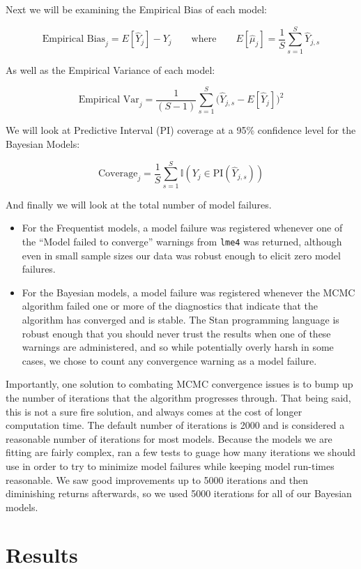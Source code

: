 \documentclass[12pt,twoside]{reedthesis}
\providecommand{\tightlist}{%
  \setlength{\itemsep}{0pt}\setlength{\parskip}{0pt}}
\begin{document}
Next we will be examining the Empirical Bias of each model:

\[
\text{Empirical Bias}_j = E[\hat{Y}_j] - Y_{j} \qquad \text{where} \qquad E[\hat{\mu}_j] = \frac{1}{S}\sum_{s = 1}^S\hat{Y}_{j, s}
\]

As well as the Empirical Variance of each model:

\[
\text{Empirical Var}_j  = \frac{1}{(S-1)}\sum_{s = 1}^S\Big(\hat{Y}_{j,s} - E[\hat{Y}_j]\Big)^2
\]

We will look at Predictive Interval (PI) coverage at a 95\% confidence level for the Bayesian Models:

\[
\text{Coverage}_j = \frac{1}{S}\sum_{s = 1}^S \mathbb{I}(Y_{j} \in \text{PI}(\hat{Y}_{j, s}))
\]

And finally we will look at the total number of model failures.
\begin{itemize}
\tightlist
\item
  For the Frequentist models, a model failure was registered whenever one of the ``Model failed to converge'' warnings from \texttt{lme4} was returned, although even in small sample sizes our data was robust enough to elicit zero model failures.
\item
  For the Bayesian models, a model failure was registered whenever the MCMC algorithm failed one or more of the diagnostics that indicate that the algorithm has converged and is stable. The Stan programming language is robust enough that you should never trust the results when one of these warnings are administered, and so while potentially overly harsh in some cases, we chose to count any convergence warning as a model failure.
\end{itemize}
Importantly, one solution to combating MCMC convergence issues is to bump up the number of iterations that the algorithm progresses through. That being said, this is not a sure fire solution, and always comes at the cost of longer computation time. The default number of iterations is 2000 and is considered a reasonable number of iterations for most models. Because the models we are fitting are fairly complex, ran a few tests to guage how many iterations we should use in order to try to minimize model failures while keeping model run-times reasonable. We saw good improvements up to 5000 iterations and then diminishing returns afterwards, so we used 5000 iterations for all of our Bayesian models.

\hypertarget{res-sec}{%
\chapter{Results}\label{res-sec}}
\end{document}
